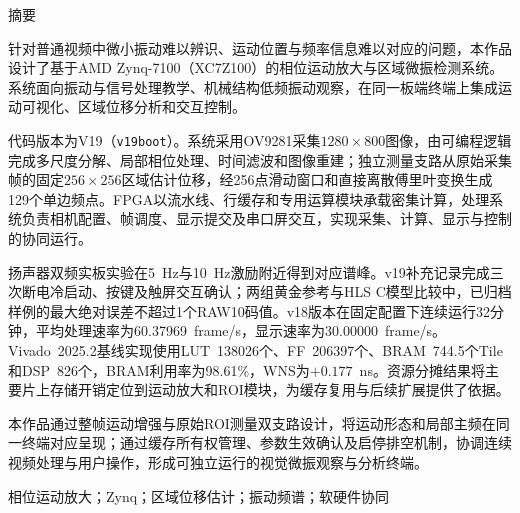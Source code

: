 \begin{center}{\heiti 摘\quad 要}\end{center}

针对普通视频中微小振动难以辨识、运动位置与频率信息难以对应的问题，本作品设计了基于AMD Zynq-7100（XC7Z100）的相位运动放大与区域微振检测系统。系统面向振动与信号处理教学、机械结构低频振动观察，在同一板端终端上集成运动可视化、区域位移分析和交互控制。

代码版本为V19（\texttt{v19boot}）。系统采用OV9281采集$1280\times800$图像，由可编程逻辑完成多尺度分解、局部相位处理、时间滤波和图像重建；独立测量支路从原始采集帧的固定$256\times256$区域估计位移，经256点滑动窗口和直接离散傅里叶变换生成129个单边频点。FPGA以流水线、行缓存和专用运算模块承载密集计算，处理系统负责相机配置、帧调度、显示提交及串口屏交互，实现采集、计算、显示与控制的协同运行。

扬声器双频实板实验在5~Hz与10~Hz激励附近得到对应谱峰。v19补充记录完成三次断电冷启动、按键及触屏交互确认；两组黄金参考与HLS C模型比较中，已归档样例的最大绝对误差不超过1个RAW10码值。v18版本在固定配置下连续运行32分钟，平均处理速率为60.37969~frame/s，显示速率为30.00000~frame/s。Vivado~2025.2基线实现使用LUT~138026个、FF~206397个、BRAM~744.5个Tile和DSP~826个，BRAM利用率为98.61\%，WNS为$+0.177$~ns。资源分摊结果将主要片上存储开销定位到运动放大和ROI模块，为缓存复用与后续扩展提供了依据。

本作品通过整帧运动增强与原始ROI测量双支路设计，将运动形态和局部主频在同一终端对应呈现；通过缓存所有权管理、参数生效确认及启停排空机制，协调连续视频处理与用户操作，形成可独立运行的视觉微振观察与分析终端。

\vspace{.8em}
\quad 相位运动放大；Zynq；区域位移估计；振动频谱；软硬件协同
